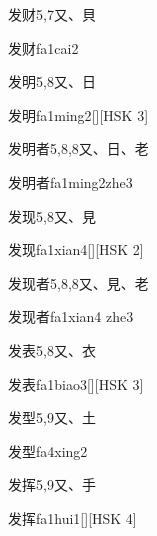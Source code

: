 \begin{entry}{发财}{5,7}{⼜、⾙}
  \begin{phonetics}{发财}{fa1cai2}
  \end{phonetics}
\end{entry}

\begin{entry}{发明}{5,8}{⼜、⽇}
  \begin{phonetics}{发明}{fa1ming2}[][HSK 3]
  \end{phonetics}
\end{entry}

\begin{entry}{发明者}{5,8,8}{⼜、⽇、⽼}
  \begin{phonetics}{发明者}{fa1ming2zhe3}
  \end{phonetics}
\end{entry}

\begin{entry}{发现}{5,8}{⼜、⾒}
  \begin{phonetics}{发现}{fa1xian4}[][HSK 2]
  \end{phonetics}
\end{entry}

\begin{entry}{发现者}{5,8,8}{⼜、⾒、⽼}
  \begin{phonetics}{发现者}{fa1xian4 zhe3}
  \end{phonetics}
\end{entry}

\begin{entry}{发表}{5,8}{⼜、⾐}
  \begin{phonetics}{发表}{fa1biao3}[][HSK 3]
  \end{phonetics}
\end{entry}

\begin{entry}{发型}{5,9}{⼜、⼟}
  \begin{phonetics}{发型}{fa4xing2}
  \end{phonetics}
\end{entry}

\begin{entry}{发挥}{5,9}{⼜、⼿}
  \begin{phonetics}{发挥}{fa1hui1}[][HSK 4]
  \end{phonetics}
\end{entry}

